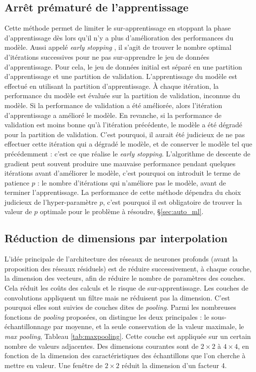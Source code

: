 \subsection{Arrêt prématuré de l'apprentissage} \label{parag:early_stopping}
Cette méthode permet de limiter le sur-apprentissage en stoppant la phase d'apprentissage dès lors qu'il n'y a plus d'amélioration des performances du modèle.
Aussi appelé \textit{early stopping} \cite{yao_early_2007}, il s'agit de trouver le nombre optimal d'itérations successives pour ne pas sur-apprendre le jeu de données d'apprentissage.
Pour cela, le jeu de données initial est séparé en une partition d'apprentissage et une partition de validation.
L'apprentissage du modèle est effectué en utilisant la partition d'apprentissage.
À chaque itération, la performance du modèle est évaluée sur la partition de validation, inconnue du modèle.
Si la performance de validation a été améliorée, alors l'itération d'apprentissage a amélioré le modèle.
En revanche, si la performance de validation est moins bonne qu'à l'itération précédente, le modèle a été dégradé pour la partition de validation.
C'est pourquoi, il aurait été judicieux de ne pas effectuer cette itération qui a dégradé le modèle, et de conserver le modèle tel que précédemment : c'est ce que réalise le \textit{early stopping}.
L'algorithme de descente de gradient peut souvent produire une mauvaise performance pendant quelques itérations avant d'améliorer le modèle, c'est pourquoi on introduit le terme de patience $p$ : le nombre d'itérations qui n'améliore pas le modèle, avant de terminer l'apprentissage.
La performance de cette méthode dépendra du choix judicieux de l'hyper-paramètre $p$, c'est pourquoi il est obligatoire de trouver la valeur de $p$ optimale pour le problème à résoudre, §\ref{sec:auto_ml}.

\subsection{Réduction de dimensions par interpolation} \label{parag:pooling}
L'idée principale de l'architecture des réseaux de neurones profonds (avant la proposition des réseaux résiduels) est de réduire successivement, à chaque couche, la dimension des vecteurs, afin de réduire le nombre de paramètres des couches. Cela réduit les coûts des calculs et le risque de sur-apprentissage.
Les couches de convolutions appliquent un filtre mais ne réduisent pas la dimension.
C'est pourquoi elles sont suivies de couches dites de \textit{pooling}. Parmi les nombreuses fonctions de \textit{pooling} proposées, on distingue les deux principales : le sous-échantillonnage par moyenne, et la seule conservation de la valeur maximale, le \textit{max pooling}, Tableau \ref{tab:maxpooling}.
Cette couche est appliquée sur un certain nombre de valeurs adjacentes.
Des dimensions courantes sont de $2 \times 2$ à $4 \times 4$, en fonction de la dimension des caractéristiques des échantillons que l'on cherche à mettre en valeur.
Une fenêtre de $2 \times 2$ réduit la dimension d'un facteur 4.

